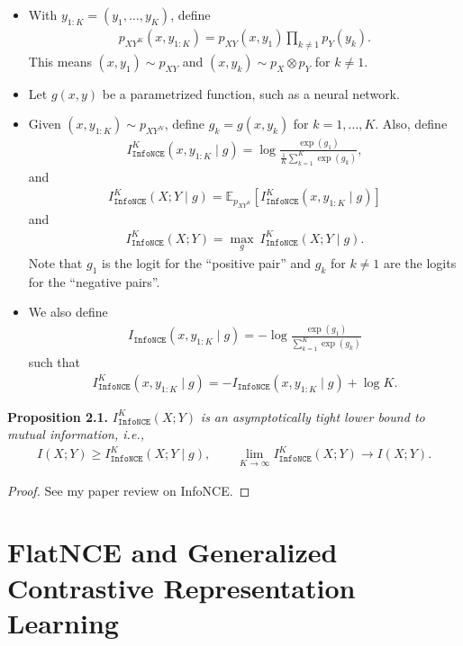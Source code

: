 \documentclass[10pt]{article}
\newcommand{\EE}{\mathbb{E}}
\newcommand{\infonce}{\texttt{InfoNCE}}
\begin{document}
\begin{itemize}
\item With $y_{1:K} = (y_1, \ldots, y_K)$, define
\begin{align*}
p_{XY^K}(x,y_{1:K}) = p_{XY}(x,y_1) \prod_{k \neq 1} p_Y(y_k).
\end{align*}
This means $(x,y_1) \sim p_{XY}$ and $(x,y_k) \sim p_X \otimes p_Y$ for $k \neq 1$.
\item Let $g(x,y)$ be a parametrized function, such as a neural network.
\item Given $(x,y_{1:K}) \sim p_{XY^N}$, define $g_k = g(x,y_k)$ for $k = 1, \ldots, K$. Also, define
\begin{align*}
I_\infonce^K(x,y_{1:K} \mid g) = \log \frac{\exp(g_1)}{\frac{1}{K} \sum_{k = 1}^K \exp(g_k) },
\end{align*}
and
\begin{align*}
I_\infonce^K(X;Y \mid g) = \EE_{p_{XY^K}} \left[ I_\infonce^K(x,y_{1:K} \mid g) \right]
\end{align*}
and
\begin{align*}
I_\infonce^K(X;Y) = \max_g \ I_\infonce^K(X;Y \mid g).
\end{align*}
Note that $g_1$ is the logit for the \enquote{positive pair} and $g_k$ for $k \neq 1$ are the logits for the \enquote{negative pairs}.
\item We also define
\begin{align*}
I_\infonce(x,y_{1:K} \mid g) = - \log \frac{\exp(g_1)}{\sum_{k = 1}^K \exp(g_k)}
\end{align*}
such that
\begin{align*}
I^K_\infonce(x,y_{1:K} \mid g) = -I_\infonce(x,y_{1:K} \mid g) + \log K.
\end{align*}
\end{itemize}

\textbf{Proposition 2.1.} $I_\infonce^K(X;Y)$ \textit{is an asymptotically tight lower bound to mutual information, i.e.,}
\begin{align*}
I(X;Y) \geq I_\infonce^K(X;Y \mid g), \qquad \lim_{K \rightarrow \infty} I_\infonce^K(X;Y) \rightarrow I(X;Y).
\end{align*}
\begin{proof}
See my paper review on InfoNCE.
\end{proof}

\newpage

\section{FlatNCE and Generalized Contrastive Representation Learning}
\end{document}
